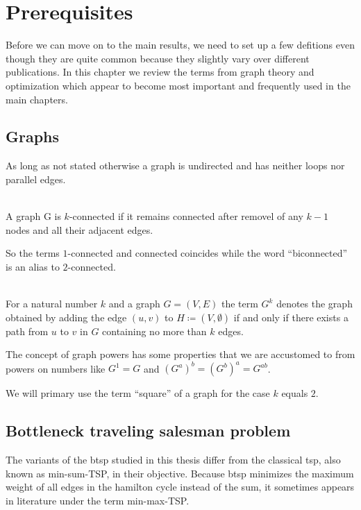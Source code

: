 \chapter{Prerequisites}
Before we can move on to the main results, we need to set up a few defitions even though they are quite common because they slightly vary over different publications. In this chapter we review the terms from graph theory and optimization which appear to become most important and frequently used in the main chapters.

\section{Graphs}
As long as not stated otherwise a graph is undirected and has neither loops nor parallel edges.

\begin{definition} [\(k\)-connected]\label{def:k_connected}\ \\
  A graph G is \(k\)-connected if it remains connected after removel of any \(k-1\) nodes and all their adjacent edges.
\end{definition}

So the terms \(1\)-connected and connected coincides while the word \enquote{biconnected} is an alias to \(2\)-connected.

\begin{definition}\label{def:power_of_graph}\ \\
  For a natural number \(k\) and a graph \(G = (V, E)\) the term \(G^{k}\) denotes the graph obtained by adding the edge \((u,v)\) to \(H \coloneqq (V, \emptyset)\) if and only if there exists a path from \(u\) to \(v\) in \(G\) containing no more than \(k\) edges.
\end{definition}

The concept of graph powers has some properties that we are accustomed to from powers on numbers like \(G^1 = G\) and \({(G^a)}^b = {(G^b)}^a = G^{ab}\).

We will primary use the term \enquote{square} of a graph for the case \(k\) equals \(2\).


\section{Bottleneck traveling salesman problem}
The variants of the \ac{btsp} studied in this thesis differ from the classical \ac{tsp}, also known as min-sum-TSP, in their objective. Because \ac{btsp} minimizes the maximum weight of all edges in the hamilton cycle instead of the sum, it sometimes appears in literature under the term min-max-TSP.

